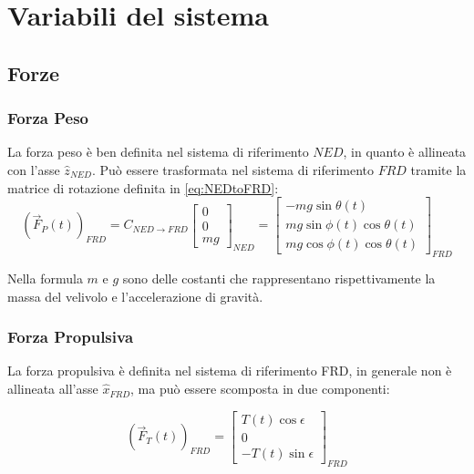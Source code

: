 \section{Variabili del sistema}

\subsection{Forze}
\subsubsection{Forza Peso}
La forza peso è ben definita nel sistema di riferimento $NED$, in quanto è allineata con l'asse $\hat{z}_{NED}$. Può essere trasformata nel sistema di riferimento $FRD$ tramite la matrice di rotazione definita in \eqref{eq:NEDtoFRD}:
\begin{equation}
    \label{eq:Fpeso}
    \left(\vec{F}_P(t)\right)_{FRD} = C_{NED \rightarrow FRD}\begin{bmatrix}
        0 \\
        0 \\
        mg
    \end{bmatrix}_{NED} = \begin{bmatrix}
        -mg\sin\theta (t)          \\
        mg\sin\phi(t)\cos\theta(t) \\
        mg\cos\phi(t)\cos\theta(t)
    \end{bmatrix}_{FRD}
\end{equation}

\begin{note}
    Nella formula $m$ e $g$ sono delle costanti che rappresentano rispettivamente la massa del velivolo e l'accelerazione di gravità.
\end{note}

\subsubsection{Forza Propulsiva}
La forza propulsiva è definita nel sistema di riferimento FRD, in generale non è allineata all'asse $\hat{x}_{FRD}$, ma può essere scomposta in due componenti:

\begin{equation}
    \label{eq:Fpropulsiva}
    \left(\vec{F}_T(t)\right)_{FRD} = \begin{bmatrix}
        T(t) \cos\epsilon \\
        0                 \\
        -T(t) \sin\epsilon
    \end{bmatrix}_{FRD}
\end{equation}

